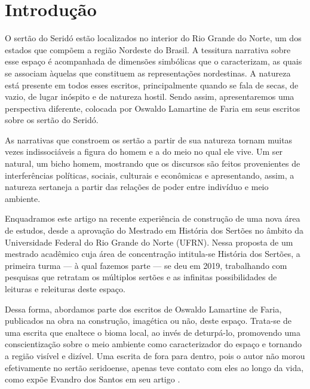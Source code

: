 \begin{refsection}
\begin{otherlanguage}{english}
    \end{otherlanguage}


    \section{Introdução}

    O sertão do Seridó estão localizados no interior do Rio Grande do Norte, um dos estados que compõem a região Nordeste do Brasil. A tessitura narrativa sobre esse espaço é acompanhada de dimensões simbólicas que o caracterizam, as quais se associam àquelas que constituem as representações nordestinas. A natureza está presente em todos esses escritos, principalmente quando se fala de secas, de vazio, de lugar inóspito e de natureza hostil. Sendo assim, apresentaremos uma perspectiva diferente, colocada por Oswaldo Lamartine de Faria em seus escritos sobre os sertão do Seridó. 

    As narrativas que constroem os sertão a partir de sua natureza tornam muitas vezes indissociáveis a figura do homem e a do meio no qual ele vive. Um ser natural, um bicho homem, mostrando que os discursos são feitos provenientes de interferências políticas, sociais, culturais e econômicas e apresentando, assim, a natureza sertaneja a partir das relações de poder entre indivíduo e meio ambiente. 

    Enquadramos este artigo na recente experiência de construção de uma nova área de estudos, desde a aprovação do Mestrado em História dos Sertões no âmbito da Universidade Federal do Rio Grande do Norte (UFRN). Nessa proposta de um mestrado acadêmico cuja área de concentração intitula-se História dos Sertões, a primeira turma --- à qual fazemos parte --- se deu em 2019, trabalhando com pesquisas que retratam os múltiplos sertões e as infinitas possibilidades de leituras e releituras deste espaço. 

    Dessa forma, abordamos parte dos escritos de Oswaldo Lamartine de Faria, publicados na obra  na construção, imagética ou não, deste espaço. Trata-se de uma escrita que enaltece o bioma local, ao invés de deturpá-lo, promovendo uma conscientização sobre o meio ambiente como caracterizador do espaço e tornando a região visível e dizível. Uma escrita de fora para dentro, pois o autor não morou efetivamente no sertão seridoense, apenas teve contato com eles ao longo da vida, como expõe Evandro dos Santos em seu artigo . 


\end{refsection}
